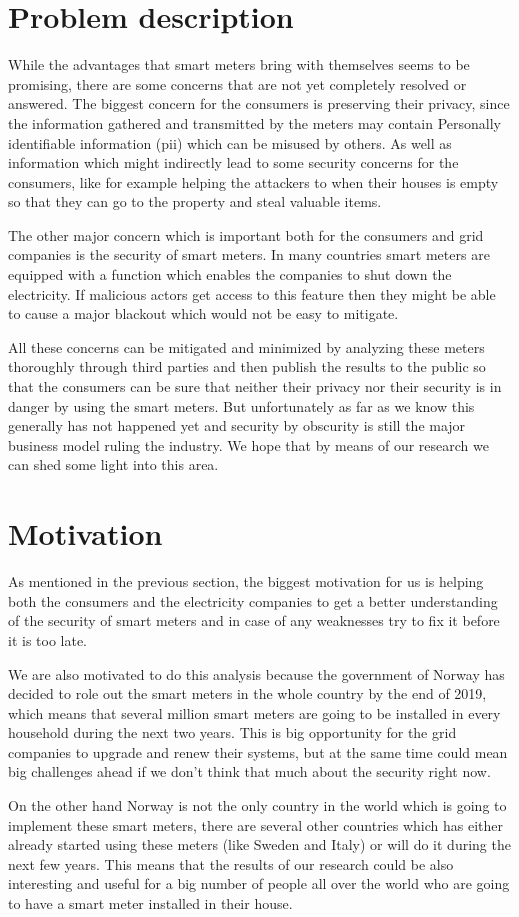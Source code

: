 \section{Problem description}

While the advantages that smart meters bring with themselves seems to be promising, there are some concerns that are not yet completely resolved or answered. The biggest concern for the consumers is preserving their privacy, since the information gathered and transmitted by the meters may contain Personally identifiable information (\ac{pii}) which can be misused by others. As well as information which might indirectly lead to some security concerns for the consumers, like for example helping the attackers to when their houses is empty so that they can go to the property and steal valuable items.\par
The other major concern which is important both for the consumers and grid companies is the security of smart meters. In many countries smart meters are equipped with a function which enables the companies to shut down the electricity. If malicious actors get access to this feature then they might be able to cause a major blackout which would not be easy to mitigate.\par 
All these concerns can be mitigated and minimized by analyzing these meters thoroughly through third parties and then publish the results to the public so that the consumers can be sure that neither their privacy nor their security is in danger by using the smart meters. But unfortunately as far as we know this generally has not happened yet and security by obscurity is still the major business model ruling the industry. We hope that by means of our research we can shed some light into this area.

\section{Motivation}

As mentioned in the previous section, the biggest motivation for us is helping both the consumers and the electricity companies to get a better understanding of the security of smart meters and in case of any weaknesses try to fix it before it is too late.\par 
We are also motivated to do this analysis because the government of Norway has decided to role out the smart meters in the whole country by the end of 2019, which means that several million smart meters are going to be installed in every household during the next two years. This is big opportunity for the grid companies to upgrade and renew their systems, but at the same time could mean big challenges ahead if we don't think that much about the security right now.\par 
On the other hand Norway is not the only country in the world which is going to implement these smart meters, there are several other countries which has either already started using these meters (like Sweden and Italy) or will do it during the next few years. This means that the results of our research could be also interesting and useful for a big number of people all over the world who are going to have a smart meter installed in their house. 


